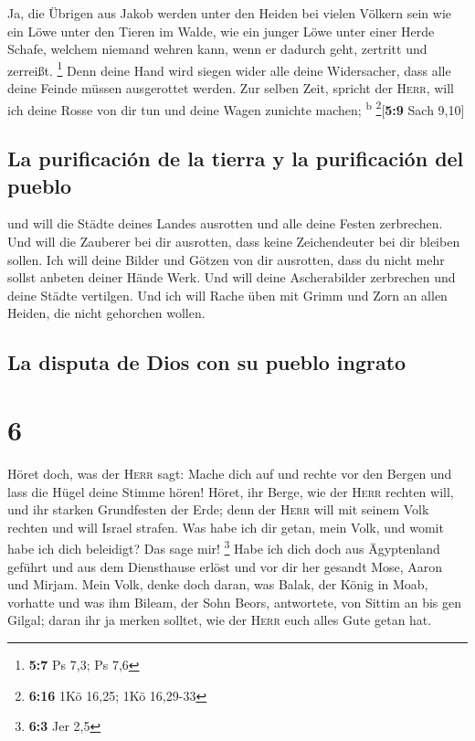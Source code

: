  Ja, die Übrigen aus Jakob werden unter den Heiden bei
vielen Völkern sein wie ein Löwe unter den Tieren im Walde, wie ein
junger Löwe unter einer Herde Schafe, welchem niemand wehren kann, wenn
er dadurch geht, zertritt und zerreißt. \footnote{\textbf{5:7} Ps 7,3;
  Ps 7,6}  Denn deine Hand wird siegen wider alle deine
Widersacher, dass alle deine Feinde müssen ausgerottet werden.
 Zur selben Zeit, spricht der \textsc{Herr}, will ich
deine Rosse von dir tun und deine Wagen zunichte machen;
\textsuperscript{b} \footnote{\textbf{6:16} 1Kö 16,25; 1Kö 16,29-33}{[}\textbf{5:9}
Sach 9,10{]}

\hypertarget{la-purificaciuxf3n-de-la-tierra-y-la-purificaciuxf3n-del-pueblo}{%
\subsection{La purificación de la tierra y la purificación del
pueblo}\label{la-purificaciuxf3n-de-la-tierra-y-la-purificaciuxf3n-del-pueblo}}

 und will die Städte deines Landes ausrotten und alle
deine Festen zerbrechen.  Und will die Zauberer bei dir
ausrotten, dass keine Zeichendeuter bei dir bleiben sollen.
 Ich will deine Bilder und Götzen von dir ausrotten, dass
du nicht mehr sollst anbeten deiner Hände Werk.  Und will
deine Ascherabilder zerbrechen und deine Städte vertilgen.
 Und ich will Rache üben mit Grimm und Zorn an allen
Heiden, die nicht gehorchen wollen.

\hypertarget{la-disputa-de-dios-con-su-pueblo-ingrato}{%
\subsection{La disputa de Dios con su pueblo
ingrato}\label{la-disputa-de-dios-con-su-pueblo-ingrato}}

\hypertarget{section-5}{%
\section{6}\label{section-5}}

 Höret doch, was der \textsc{Herr} sagt: Mache dich auf
und rechte vor den Bergen und lass die Hügel deine Stimme hören!
 Höret, ihr Berge, wie der \textsc{Herr} rechten will, und
ihr starken Grundfesten der Erde; denn der \textsc{Herr} will mit seinem
Volk rechten und will Israel strafen.  Was habe ich dir
getan, mein Volk, und womit habe ich dich beleidigt? Das sage mir!
\footnote{\textbf{6:3} Jer 2,5}  Habe ich dich doch aus
Ägyptenland geführt und aus dem Diensthause erlöst und vor dir her
gesandt Mose, Aaron und Mirjam.  Mein Volk, denke doch
daran, was Balak, der König in Moab, vorhatte und was ihm Bileam, der
Sohn Beors, antwortete, von Sittim an bis gen Gilgal; daran ihr ja
merken solltet, wie der \textsc{Herr} euch alles Gute getan hat.

